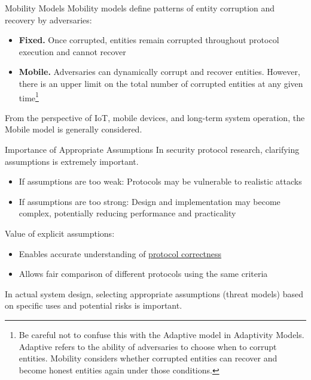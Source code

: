 \documentclass[aspectratio=169,10pt]{beamer}
\newenvironment{outlineblock}[1][]
{\begin{tcolorbox}[colframe=black, colback=white, boxrule=1pt, boxsep=5pt]}
{\end{tcolorbox}}
\begin{document}
\begin{frame}{Mobility Models}
Mobility models define patterns of entity corruption and recovery by adversaries:

\vspace{0.5em}

\begin{itemize}
    \item \textbf{Fixed. }Once corrupted, entities remain corrupted throughout protocol execution and cannot recover
    
    \item \textbf{Mobile. }Adversaries can dynamically corrupt and recover entities. However, there is an upper limit on the total number of corrupted entities at any given time\footnote{Be careful not to confuse this with the Adaptive model in Adaptivity Models. Adaptive refers to the ability of adversaries to choose when to corrupt entities. Mobility considers whether corrupted entities can recover and become honest entities again under those conditions.}
\end{itemize}

\vspace{0.5em}

\begin{outlineblock}[]
From the perspective of IoT, mobile devices, and long-term system operation, the Mobile model is generally considered.
\end{outlineblock}
\end{frame}

\begin{frame}{Importance of Appropriate Assumptions}
In security protocol research, clarifying assumptions is extremely important.

\vspace{0.5em}

\begin{itemize}
    \item If assumptions are too weak: Protocols may be vulnerable to realistic attacks
    \item If assumptions are too strong: Design and implementation may become complex, potentially reducing performance and practicality
\end{itemize}

\vspace{0.5em}

Value of explicit assumptions:
\begin{itemize}
    \item Enables accurate understanding of \underline{protocol correctness}
    \item Allows fair comparison of different protocols using the same criteria
\end{itemize}

\vspace{0.5em}

\begin{outlineblock}[]
In actual system design, selecting appropriate assumptions (threat models) based on specific uses and potential risks is important.
\end{outlineblock}
\end{frame}
\end{document}
